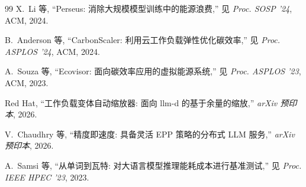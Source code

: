 \begin{thebibliography}{99}
X.~Li 等, ``Perseus: 消除大规模模型训练中的能源浪费,'' 见 \emph{Proc. SOSP '24}, ACM, 2024.

B.~Anderson 等, ``CarbonScaler: 利用云工作负载弹性优化碳效率,'' 见 \emph{Proc. ASPLOS '24}, ACM, 2024.

A.~Souza 等, ``Ecovisor: 面向碳效率应用的虚拟能源系统,'' 见 \emph{Proc. ASPLOS '23}, ACM, 2023.

Red Hat, ``工作负载变体自动缩放器: 面向 llm-d 的基于余量的缩放,'' \emph{arXiv 预印本}, 2026.

V.~Chaudhry 等, ``精度即速度: 具备灵活 EPP 策略的分布式 LLM 服务,'' \emph{arXiv 预印本}, 2026.

A.~Samsi 等, ``从单词到瓦特: 对大语言模型推理能耗成本进行基准测试,'' 见 \emph{Proc. IEEE HPEC '23}, 2023.

\end{thebibliography}

